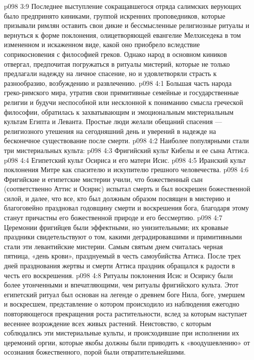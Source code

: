 \vs p098 3:9 \pc Последнее выступление сокращавшегося отряда салимских верующих было предпринято киниками, группой искренних проповедников, которые призывали римлян оставить свои дикие и бессмысленные религиозные ритуалы и вернуться к форме поклонения, олицетворяющей евангелие Мелхиседека в том измененном и искаженном виде, какой оно приобрело вследствие соприкосновения с философией греков. Однако народ в основном киников отвергал, предпочитая погружаться в ритуалы мистерий, которые не только предлагали надежду на личное спасение, но и удовлетворяли страсть к разнообразию, возбуждению и развлечению.
\vs p098 4:1 Большая часть народа греко\hyp{}римского мира, утратив свои примитивные семейные и государственные религии и будучи неспособной или несклонной к пониманию смысла греческой философии, обратилась к захватывающим и эмоциональным мистериальным культам Египта и Леванта. Простые люди желали обещаний спасения --- религиозного утешения на сегодняшний день и уверений в надежде на бесконечное существование после смерти.
\vs p098 4:2 Наиболее популярными стали три мистериальных культа:
\vs p098 4:3 \bibnobreakspace Фригийский культ Кибелы и ее сына Аттиса.
\vs p098 4:4 \bibnobreakspace Египетский культ Осириса и его матери Исис.
\vs p098 4:5 \bibnobreakspace Иранский культ поклонения Митре как спасителю и искупителю грешного человечества.
\vs p098 4:6 \pc Фригийские и египетские мистерии учили, что божественный сын (соответственно Аттис и Осирис) испытал смерть и был воскрешен божественной силой, и далее, что все, кто был должным образом посвящен в мистерию и благоговейно праздновал годовщину смерти и воскрешения бога, благодаря этому станут причастны его божественной природе и его бессмертию.
\vs p098 4:7 \pc Церемонии фригийцев были эффектными, но унизительными; их кровавые праздники свидетельствуют о том, какими деградировавшими и примитивными стали эти левантийские мистерии. Самым святым днем считалась черная пятница, «день крови», празднуемый в честь самоубийства Аттиса. После трех дней празднования жертвы и смерти Аттиса праздник обращался к радости в честь его воскрешения.
\vs p098 4:8 Ритуалы поклонения Исис и Осирису были более утонченными и впечатляющими, чем ритуалы фригийского культа. Этот египетский ритуал был основан на легенде о древнем боге Нила, боге, умершем и воскресшем, представление о котором происходило из наблюдения ежегодно повторяющегося прекращения роста растительности, вслед за которым наступает весеннее возрождение всех живых растений. Неистовство, с которым соблюдались эти мистериальные культы, и происходившие при исполнении их церемоний оргии, которые якобы должны были приводить к «воодушевлению» от осознания божественного, порой были отвратительнейшими.
